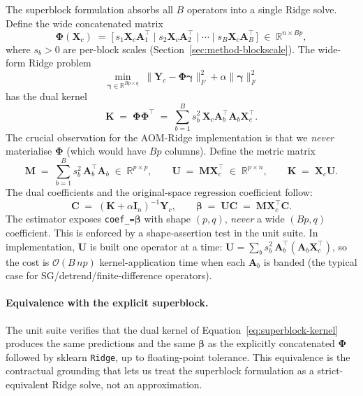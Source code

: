 \documentclass[11pt,a4paper]{article}
\newcommand{\R}{\mathbb{R}}
\newcommand{\identity}{\mathbf{I}}
\newcommand{\Xmat}{\mathbf{X}}
\newcommand{\Yc}{\mathbf{Y}_{\!c}}
\newcommand{\Amat}{\mathbf{A}}
\newcommand{\Kmat}{\mathbf{K}}
\newcommand{\Umat}{\mathbf{U}}
\newcommand{\Mmat}{\mathbf{M}}
\newcommand{\Cmat}{\mathbf{C}}
\newcommand{\Phimat}{\mathbf{\Phi}}
\begin{document}
The superblock formulation absorbs all $B$ operators into a single
Ridge solve. Define the wide concatenated matrix
\begin{equation}
\Phimat(\Xmat_c) \;=\; \big[\,s_1\Xmat_c\Amat_1^\top \;\big|\; s_2\Xmat_c\Amat_2^\top \;\big|\;\cdots\;\big|\; s_B\Xmat_c\Amat_B^\top\,\big]
\;\in\;\R^{n\times Bp},
\label{eq:phi-superblock}
\end{equation}
where $s_b>0$ are per-block scales (Section~\ref{sec:method-blockscale}).
The wide-form Ridge problem
\begin{equation}
\min_{\bm\gamma\in\R^{Bp\times q}}\;\|\Yc-\Phimat\bm\gamma\|_F^2 + \alpha\|\bm\gamma\|_F^2
\end{equation}
has the dual kernel
\begin{equation}
\Kmat \;=\; \Phimat\Phimat^\top \;=\; \sum_{b=1}^B s_b^2\,\Xmat_c\Amat_b^\top\Amat_b\Xmat_c^\top.
\label{eq:superblock-kernel}
\end{equation}
The crucial observation for the AOM-Ridge implementation is that we
\emph{never} materialise $\Phimat$ (which would have $Bp$ columns).
Define the metric matrix
\begin{equation}
\Mmat \;=\; \sum_{b=1}^B s_b^2\,\Amat_b^\top\Amat_b \;\in\;\R^{p\times p},
\qquad
\Umat \;=\; \Mmat\Xmat_c^\top \;\in\;\R^{p\times n},
\qquad
\Kmat \;=\; \Xmat_c\Umat.
\label{eq:M-U-K}
\end{equation}
The dual coefficients and the original-space regression coefficient
follow:
\begin{equation}
\Cmat \;=\; (\Kmat+\alpha\identity_n)^{-1}\Yc,
\qquad
\bm\beta \;=\; \Umat\Cmat \;=\; \Mmat\Xmat_c^\top\Cmat.
\label{eq:beta-superblock}
\end{equation}
The estimator exposes \texttt{coef\_=}$\bm\beta$ with shape $(p,q)$,
\emph{never} a wide $(Bp,q)$ coefficient. This is enforced by a
shape-assertion test in the unit suite. In implementation,
$\Umat$ is built one operator at a time:
$\Umat=\sum_b s_b^2\,\Amat_b^\top(\Amat_b\Xmat_c^\top)$, so the cost
is $\mathcal{O}(B\,np)$ kernel-application time when each $\Amat_b$ is
banded (the typical case for SG/detrend/finite-difference operators).

\paragraph{Equivalence with the explicit superblock.}
The unit suite verifies that the dual kernel of
Equation~\eqref{eq:superblock-kernel} produces the same predictions
and the same $\bm\beta$ as the explicitly concatenated $\Phimat$
followed by sklearn \texttt{Ridge}, up to floating-point tolerance.
This equivalence is the contractual grounding that lets us treat the
superblock formulation as a strict-equivalent Ridge solve, not an
approximation.
\end{document}
